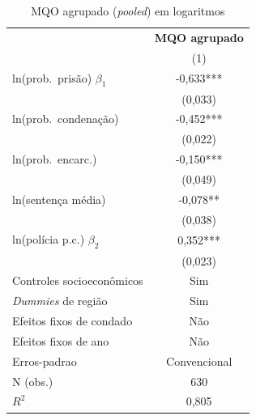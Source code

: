 \begin{table}[htbp]\centering
\caption{MQO agrupado (\textit{pooled}) em logaritmos}\label{tab:q3_pooled}
\small
\begin{tabular}{lc}
\toprule
 & \textbf{MQO agrupado} \\
 & (1) \\
\midrule
ln(prob.\ pris\~ao) $\beta_1$ & -0,633*** \\
 & (0,033) \\
ln(prob.\ condena\c{c}\~ao) & -0,452*** \\
 & (0,022) \\
ln(prob.\ encarc.) & -0,150*** \\
 & (0,049) \\
ln(senten\c{c}a m\'edia) & -0,078** \\
 & (0,038) \\
ln(pol\'icia p.c.) $\beta_2$ & 0,352*** \\
 & (0,023) \\
\midrule
Controles socioecon\^omicos & Sim \\
\textit{Dummies} de regi\~ao & Sim \\
Efeitos fixos de condado & N\~ao \\
Efeitos fixos de ano & N\~ao \\
Erros-padrao & Convencional \\
N (obs.) & 630 \\
$R^2$ & 0,805 \\
\bottomrule
\end{tabular}
\par\vspace{2pt}{\footnotesize\itshape Erros-padrao entre parenteses. *** p$<$0,01; ** p$<$0,05; * p$<$0,10. Variavel dependente: ln(taxa de crime).}
\end{table}
